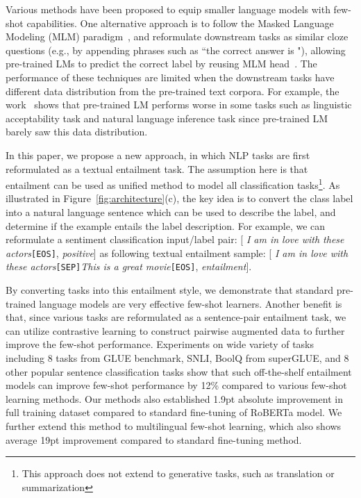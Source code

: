 \documentclass{article}
\begin{document}
Various methods have been proposed to equip smaller language models with few-shot capabilities. One alternative approach is to follow the Masked Language Modeling (MLM) paradigm~\citep{devlin2019bert}, and reformulate downstream tasks as similar cloze questions (e.g., by appending phrases such as ``the correct answer is "), allowing pre-trained LMs to predict the correct label by reusing MLM head~\citep{schick2020exploiting,schick2020s}. The performance of these techniques are limited when the downstream tasks have different data distribution from the pre-trained text corpora. For example, the work~\citep{gao2020making} shows that pre-trained LM performs worse in some tasks such as linguistic acceptability task and natural language inference task since pre-trained LM barely saw this data distribution.


In this paper, we propose a new approach, in which NLP tasks are first reformulated as a textual entailment task. The assumption here is that entailment can be used as unified method to model all classification tasks\footnote{This approach does not extend to generative tasks, such as translation or summarization}. As illustrated in Figure~\ref{fig:architecture}(c), the key idea is to convert the class label into a natural language sentence which can be used to describe the label, and determine if the example entails the label description. For example, we can reformulate a sentiment classification input/label pair: [ \textit{I am in love with these actors}\texttt{[EOS]},  \textit{positive}] as following textual entailment sample: [ \textit{I am in love with these actors}\texttt{[SEP]}\textit{This is a great movie}\texttt{[EOS]},  \textit{entailment}]. 

By converting tasks into this entailment style, we demonstrate that standard pre-trained language models are very effective few-shot learners. Another benefit is that, since various tasks are reformulated as a sentence-pair entailment task, we can utilize contrastive learning to construct pairwise augmented data to further improve the few-shot performance. Experiments on wide variety of tasks including 8 tasks from GLUE benchmark, SNLI, BoolQ from superGLUE, and 8 other popular sentence classification tasks show that such off-the-shelf entailment models can improve few-shot performance by 12\% compared to various few-shot learning methods. Our methods also established 1.9pt absolute improvement in full training dataset compared to standard fine-tuning of RoBERTa model. We further extend this method to multilingual few-shot learning, which also shows average 19pt improvement compared to standard fine-tuning method.
\end{document}
